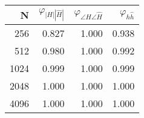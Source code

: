 \begin{tabular}{rrrr}
\toprule
N & $\varphi_{|H||\hat{H}|}$ & $\varphi_{\angle H\angle \hat{H}}$ & $\varphi_{h\hat{h}}$ \\
\midrule
256 & 0.827 & 1.000 & 0.938 \\
512 & 0.980 & 1.000 & 0.992 \\
1024 & 0.999 & 1.000 & 0.999 \\
2048 & 1.000 & 1.000 & 1.000 \\
4096 & 1.000 & 1.000 & 1.000 \\
\bottomrule
\end{tabular}
